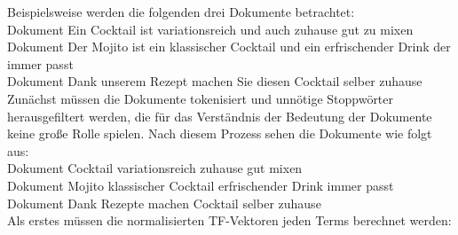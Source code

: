 Beispielsweise werden die folgenden drei Dokumente betrachtet:\\
Dokument  \glqq Ein Cocktail ist variationsreich und auch zuhause gut zu mixen\grqq{}\\
Dokument  \glqq Der Mojito ist ein klassischer Cocktail und ein erfrischender Drink der 
immer passt\grqq{}\\
Dokument  \glqq Dank unserem Rezept machen Sie diesen Cocktail selber zuhause\grqq{}\\
Zunächst müssen die Dokumente tokenisiert und unnötige Stoppwörter herausgefiltert werden, die für das Verständnis der Bedeutung der Dokumente keine große Rolle spielen. 
Nach diesem Prozess sehen die Dokumente wie folgt aus:\\
Dokument  \glqq Cocktail variationsreich zuhause gut mixen\grqq{}\\
Dokument  \glqq Mojito klassischer Cocktail erfrischender Drink immer passt\grqq{}\\
Dokument  \glqq Dank Rezepte machen Cocktail selber zuhause\grqq{}\\
Als erstes müssen die normalisierten \ac{TF}-Vektoren jeden Terms berechnet werden:
